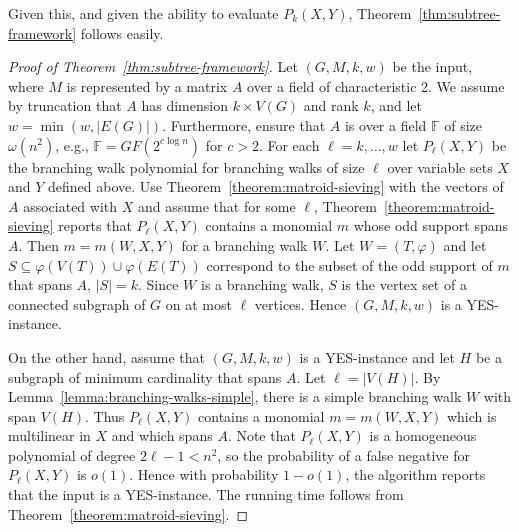 \documentclass{theoretics}
\newcommand{\F}{\ensuremath{\mathbb F}\xspace}
\begin{document}
Given this, and given the ability to evaluate $P_k(X,Y)$,
Theorem~\ref{thm:subtree-framework} follows easily.

\begin{proof}[Proof of Theorem~\ref{thm:subtree-framework}]
  Let $(G, M, k, w)$ be the input, where $M$ is represented by a
  matrix $A$ over a field of characteristic 2. We assume by truncation
  that $A$ has dimension $k \times V(G)$ and rank $k$,
  and let $w=\min(w,|E(G)|)$. 
  Furthermore, ensure that $A$ is over a field $\F$ of size
  $\omega(n^2)$, e.g., $\F=GF(2^{c \log n})$ for $c > 2$.
  For each $\ell=k, \ldots, w$ let $P_\ell(X,Y)$ be the branching walk
  polynomial for branching walks of size $\ell$ over variable sets $X$ and $Y$
  defined above. Use Theorem~\ref{theorem:matroid-sieving}
  with the vectors of $A$ associated with $X$ 
  and assume that for some $\ell$, Theorem~\ref{theorem:matroid-sieving} reports that $P_\ell(X,Y)$
  contains a monomial $m$ whose odd support spans $A$.
  Then $m=m(W,X,Y)$ for a branching walk $W$. Let $W=(T,\varphi)$
  and let $S \subseteq \varphi(V(T)) \cup \varphi(E(T))$ correspond 
  to the subset of the odd support of $m$ that spans $A$, $|S|=k$. 
  Since $W$ is a branching walk, $S$ is the vertex set 
  of a connected subgraph of $G$ on at most $\ell$ vertices. 
  Hence $(G,M,k,w)$ is a YES-instance.

  On the other hand, assume that $(G,M,k,w)$ is a YES-instance
  and let $H$ be a subgraph of minimum cardinality that spans $A$.
  Let $\ell=|V(H)|$. 
  By Lemma~\ref{lemma:branching-walks-simple}, 
  there is a simple branching walk $W$ with span $V(H)$.
  Thus $P_\ell(X,Y)$ contains a monomial $m=m(W,X,Y)$ which is multilinear in $X$
  and which spans $A$. 
  Note that $P_\ell(X,Y)$ is a homogeneous polynomial of degree
  $2\ell - 1 < n^2$, so the probability of a false negative for
  $P_\ell(X,Y)$ is $o(1)$.
  Hence with probability $1-o(1)$, the algorithm reports that the
  input is a YES-instance.
  The running time follows from Theorem~\ref{theorem:matroid-sieving}.


\end{proof}
\end{document}

